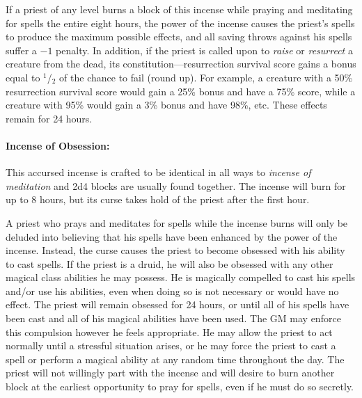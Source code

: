 \begin{multicols}{2}
If a priest of any level burns a block of this incense while praying and meditating for spells the entire eight hours, the power of the incense causes the priest's spells to produce the maximum possible effects, and all saving throws against his spells suffer a $-1$ penalty.  In addition, if the priest is called upon to \textit{raise} or \textit{resurrect} a creature from the dead, its constitution---resurrection survival score gains a bonus equal to $^1$/$_2$ of the chance to fail (round up).  For example, a creature with a 50\% resurrection survival score would gain a 25\% bonus and have a 75\% score, while a creature with 95\% would gain a 3\% bonus and have 98\%, etc.  These effects remain for 24 hours.

\paragraph{Incense of Obsession:} This accursed incense is crafted to be identical in all ways to \textit{incense of meditation} and 2d4 blocks are usually found together.  The incense will burn for up to 8 hours, but its curse takes hold of the priest after the first hour.  

A priest who prays and meditates for spells while the incense burns will only be deluded into believing that his spells have been enhanced by the power of the incense.  Instead, the curse causes the priest to become obsessed with his ability to cast spells.  If the priest is a druid, he will also be obsessed with any other magical class abilities he may possess.  He is magically compelled to cast his spells and/or use his abilities, even when doing so is not necessary or would have no effect.  The priest will remain obsessed for 24 hours, or until all of his spells have been cast and all of his magical abilities have been used.  The GM may enforce this compulsion however he feels appropriate.  He may allow the priest to act normally until a stressful situation arises, or he may force the priest to cast a spell or perform a magical ability at any random time throughout the day.  The priest will not willingly part with the incense and will desire to burn another block at the earliest opportunity to pray for spells, even if he must do so secretly.


\end{multicols}
